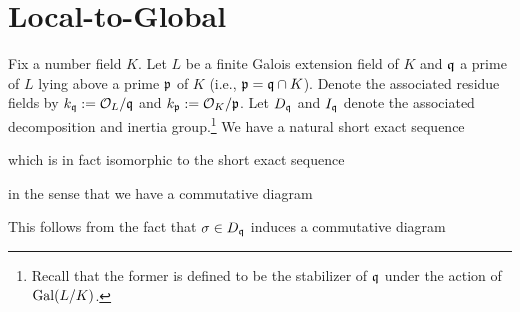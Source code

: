 \documentclass[11pt]{article}
\begin{document}
\section{Local-to-Global}
Fix a number field $K$. Let $L$ be a finite Galois extension field of $K$ and $\mathfrak{q}$ a prime of $L$ lying above a prime $\mathfrak{p}$ of $K$ (i.e., $\mathfrak{p}=\mathfrak{q}\cap K$). Denote the associated residue fields by $k_{\mathfrak{q}}:=\mathcal{O}_L/\mathfrak{q}$ and $k_{\mathfrak{p}}:=\mathcal{O}_K/\mathfrak{p}$. Let $D_{\mathfrak{q}}$ and $I_{\mathfrak{q}}$ denote the associated decomposition and inertia group.\footnote{Recall that the former is defined to be the stabilizer of $\mathfrak{q}$ under the action of $\operatorname{Gal}(L/K)$.} We have a natural short exact sequence
\begin{center}
\end{center}
which is in fact isomorphic to the short exact sequence
\begin{center}
\end{center}
in the sense that we have a commutative diagram
\begin{center}
\end{center}
This follows from the fact that $\sigma\in D_{\mathfrak{q}}$ induces a commutative diagram
\begin{center}
\end{center}
\end{document}
